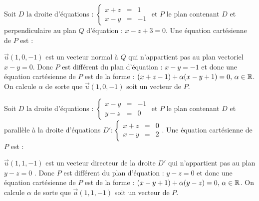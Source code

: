 \begin{question} 

Soit $D$ la droite d'équations :  $ \left\{\begin{array}{ccl}x+z&=&1\\x-y&=&-1 \end{array}\right.$ et $P$ le plan contenant $D$ et perpendiculaire au plan $Q$ d'équation : $x-z+3=0$.  Une équation cartésienne de $P$ est : 
\begin{answers}

 
    
   
   
\end{answers}
\begin{explanations}
$\vec{u}(1,0,-1)$ est un vecteur normal à $ Q$ qui n'appartient pas au  plan vectoriel $x-y=0$. Donc $P$ est différent du plan d'équation : $x-y=-1$ et donc  une équation cartésienne de $P$ est  de la forme : $(x+z-1) + \alpha(x-y+1)=0, \, \alpha \in \mathbb{R}$. On calcule $\alpha$ de sorte que $\vec{u}(1,0,-1)$ soit un vecteur de  $P$.
\end{explanations}

\end{question}
 

\begin{question} 

Soit $D$ la droite d'équations :  $ \left\{\begin{array}{ccl}x-y&=&-1\\y-z&=&0 \end{array}\right.$ et $P$ le plan contenant $D$ et parallèle à la droite d'équations  $D' : \left\{\begin{array}{ccl}x+z&=&0\\x-y&=&2 \end{array}\right.$. 
 Une équation cartésienne de $P$ est :
\begin{answers}

 
    
   
   
\end{answers}
\begin{explanations}
$\vec{u}(1,1,-1)$ est un vecteur directeur de la droite $D'$ qui  n'appartient pas au  plan  $y-z=0$ .   Donc $P$ est différent du plan d'équation :  $y-z=0$ et donc une équation cartésienne de $P$ est  de la forme : $(x-y+1) + \alpha(y-z)=0, \, \alpha \in \mathbb{R}$. On calcule $\alpha$ de sorte que $\vec{u}(1,1,-1)$ soit un vecteur de  $P$.
\end{explanations}

\end{question}

